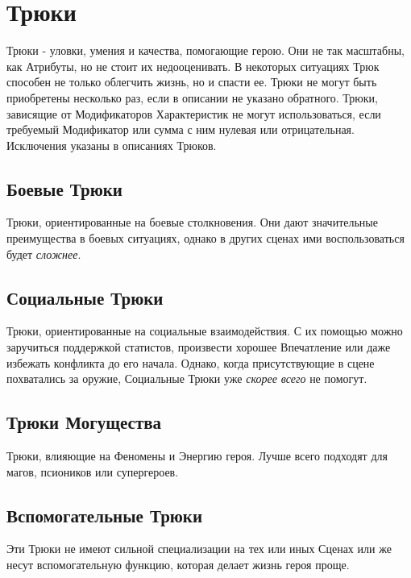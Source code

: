 \section{Трюки}
Трюки - уловки, умения и качества, помогающие герою. Они не так масштабны, как Атрибуты, но не стоит их недооценивать. В некоторых ситуациях Трюк способен не только облегчить жизнь, но и спасти ее. 
\newline Трюки не могут быть приобретены несколько раз, если в описании не указано обратного.
\newline Трюки, зависящие от Модификаторов Характеристик не могут использоваться, если требуемый Модификатор или сумма с ним нулевая или отрицательная. Исключения указаны в описаниях Трюков.

\subsection{Боевые Трюки}
Трюки, ориентированные на боевые столкновения. Они дают значительные преимущества в боевых ситуациях, однако в других сценах ими воспользоваться будет \textit{сложнее}.

\subsection{Социальные Трюки}
Трюки, ориентированные на социальные взаимодействия. С их помощью можно заручиться поддержкой статистов, произвести хорошее Впечатление или даже избежать конфликта до его начала. Однако, когда присутствующие в сцене похватались за оружие, Социальные Трюки уже \textit{скорее всего} не помогут.

\subsection{Трюки Могущества}
Трюки, влияющие на Феномены и Энергию героя. Лучше всего подходят для магов, псиоников или супергероев.

\subsection{Вспомогательные Трюки}
Эти Трюки не имеют сильной специализации на тех или иных Сценах или же несут вспомогательную функцию, которая делает жизнь героя проще.

\printindex[tricks]